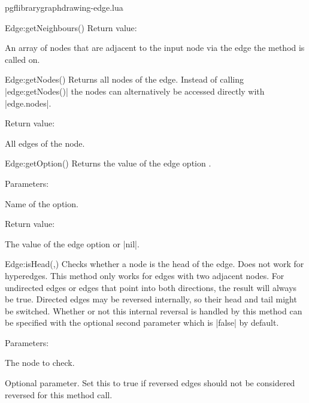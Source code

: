 \begin{filedescription}{pgflibrarygraphdrawing-edge.lua}
\begin{luacommand}{{Edge:getNeighbours}()}
Return value:
\begin{parameterdescription} 
  \item[] An array of nodes that are adjacent to the input node via the edge the method is called on. 
\end{parameterdescription}


\end{luacommand}
\begin{luacommand}{{Edge:getNodes}()}
Returns all nodes of the edge.  Instead of calling |edge:getNodes()| the nodes can alternatively be accessed directly with |edge.nodes|. 


Return value:
\begin{parameterdescription} 
  \item[] All edges of the node. 
\end{parameterdescription}


\end{luacommand}
\begin{luacommand}{{Edge:getOption}()}
Returns the value of the edge option . 

Parameters:
\begin{parameterdescription}
	\item[\meta{name}] Name of the option. 
\end{parameterdescription}


Return value:
\begin{parameterdescription} 
  \item[] The value of the edge option  or |nil|. 
\end{parameterdescription}


\end{luacommand}
\begin{luacommand}{{Edge:isHead}(,)}
Checks whether a node is the head of the edge. Does not work for hyperedges.  This method only works for edges with two adjacent nodes.  For undirected edges or edges that point into both directions, the result will always be true. Directed edges may be reversed internally, so their head and tail might be switched. Whether or not this internal reversal is handled by this method can be specified with the optional second  parameter which is |false| by default. 

Parameters:
\begin{parameterdescription}
	\item[\meta{node}] The node to check.\item[\meta{ignore\_reversed}] Optional parameter. Set this to true if reversed edges should not be considered reversed for this method call. 
\end{parameterdescription}



\end{luacommand}
\end{filedescription}
